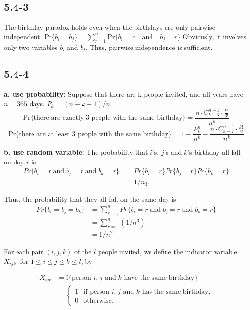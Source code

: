 \documentclass{book}
\begin{document}
\begin{CJK}{UTF8}{gkai}
\subsection*{5.4-3}
The birthday paradox holds even when the birthdays are only pairwise 
independent.  
$\mbox{Pr}\{b_i=b_j\}=\sum_{r=1}^n\mbox{Pr}\{b_i=r\quad\mbox{and}\quad b_j=r\}$
Obviously, it involves only two variables $b_i$ and $b_j$. Thus, pairwise 
independence is sufficient.

\subsection*{5.4-4}
\textbf{a. use probability: } Suppose that there are k people invited, and all 
years have $n=365$ days. $P_k = (n-k+1)/n$
$$\mbox{Pr\{there are exactly 3 people with the same birthday\}} = \frac{n \cdot C^{n-1}_{k-3} \cdot \frac{k!}{3!}}{n^k}$$
$$\mbox{Pr\{there are at least 3 people with the same birthday\}} = 1 - \frac{P^n_k}{n^k} - \frac{n \cdot C^{n-1}_{k-2} \cdot \frac{k!}{2!}}{n^k}$$

\textbf{b. use random variable: } The probability that $i$'s, $j$'s and $k$'s 
birthday all fall on day $r$ is
\begin{align*}
Pr\{b_i=r \;\text{and}\; b_j=r\;\text{and}\; b_k=r\} & = 
Pr\{b_i=r\}Pr\{b_j=r\}Pr\{b_k=r\} \\
& = 1/n_3.
\end{align*}

Thus, the probability that they all fall on the same day is
\begin{align*}
Pr\{b_i = b_j = b_k\} &= 
\sum_{r=1}^{n}Pr\{b_i=r\;\text{and}\;b_j=r\;\text{and}\;b_k=r\} \\
& = \sum_{r=1}^{n}(1/n^3) \\
& = 1/n^2
\end{align*}

For each pair $(i,j,k)$ of the $l$ people invited, we define the indicator 
variable $X_{ijk}$, for $1\le i \le j \le k \le l$, by

\begin{align*}
X_{ijk} & = \text{I\{person $i$, $j$ and $k$ have the same birthday\}} \\
& = \left\{
\begin{array}{rl}
  1 & \text{if person $i$, $j$ and $k$ has the same birthday,}  \\
  0 & \text{otherwise.}
\end{array} \right.
\end{align*}


\end{CJK}
\end{document}
